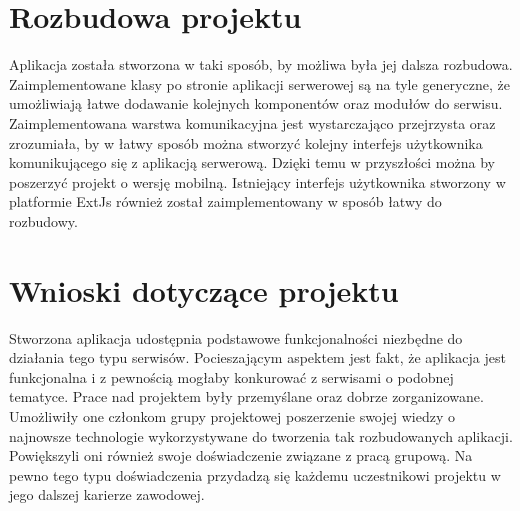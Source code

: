 \section{Rozbudowa projektu}

Aplikacja została stworzona w taki sposób, by możliwa była jej dalsza rozbudowa. Zaimplementowane klasy po stronie aplikacji serwerowej są na tyle generyczne, że umożliwiają łatwe dodawanie kolejnych komponentów oraz modułów do serwisu. Zaimplementowana warstwa komunikacyjna jest wystarczająco przejrzysta oraz zrozumiała, by w łatwy sposób można stworzyć kolejny interfejs użytkownika komunikującego się z aplikacją serwerową. Dzięki temu w przyszłości można by poszerzyć projekt o wersję mobilną.
Istniejący interfejs użytkownika stworzony w platformie ExtJs również został zaimplementowany w sposób łatwy do rozbudowy. 

\section{Wnioski dotyczące projektu}

Stworzona aplikacja udostępnia podstawowe funkcjonalności niezbędne do działania tego typu serwisów. Pocieszającym aspektem jest fakt, że aplikacja jest funkcjonalna i z pewnością mogłaby konkurować z serwisami o podobnej tematyce. 
Prace nad projektem były przemyślane oraz dobrze zorganizowane. Umożliwiły one członkom grupy projektowej poszerzenie swojej wiedzy o najnowsze technologie wykorzystywane do tworzenia tak rozbudowanych aplikacji. Powiększyli oni również swoje doświadczenie związane z pracą grupową. 
Na pewno tego typu doświadczenia przydadzą się każdemu uczestnikowi projektu w jego dalszej karierze zawodowej.